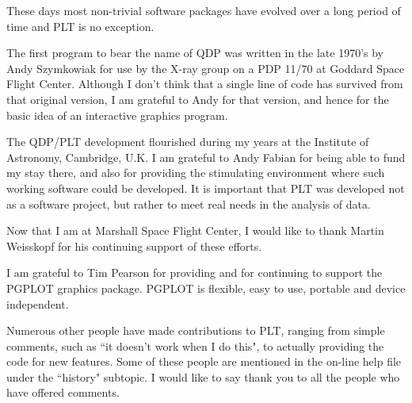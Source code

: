 These days most non-trivial software packages have evolved over a
long period of time and PLT is no exception.

The first program to bear the name of QDP was written in the late
1970's by Andy Szymkowiak for use by the X-ray group on a PDP 11/70
at Goddard Space Flight Center.  Although I don't think that a single
line of code has survived from that original version, I am grateful
to Andy for that version, and hence for the basic idea of an interactive
graphics program.

The QDP/PLT development flourished during my years at the Institute
of Astronomy, Cambridge, U.K.  I am grateful to Andy Fabian for being
able to fund my stay there, and also for providing the stimulating
environment where such working software could be developed.  It is
important that PLT was developed not as a software project, but rather
to meet real needs in the analysis of data.

Now that I am at Marshall Space Flight Center, I would like to thank
Martin Weisskopf for his continuing support of these efforts.

I am grateful to Tim Pearson for providing and for continuing to support
the PGPLOT graphics package.  PGPLOT is flexible, easy to use, portable
and device independent.

Numerous other people have made contributions to PLT, ranging from
simple comments, such as ``it doesn't work when I do this", to actually
providing the code for new features.  Some of these people are mentioned
in the on-line help file under the ``history" subtopic.  I would like
to say thank you to all the people who have offered comments.
